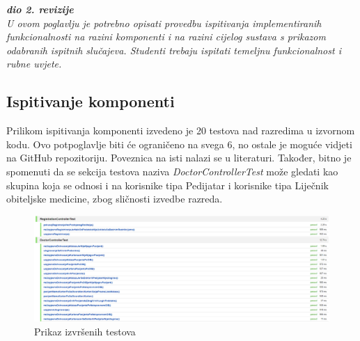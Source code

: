			\textbf{\textit{dio 2. revizije}}\\
			
			 \textit{U ovom poglavlju je potrebno opisati provedbu ispitivanja implementiranih funkcionalnosti na razini komponenti i na razini cijelog sustava s prikazom odabranih ispitnih slučajeva. Studenti trebaju ispitati temeljnu funkcionalnost i rubne uvjete.}
	
			
			\subsection{Ispitivanje komponenti}
			\text Prilikom ispitivanja komponenti izvedeno je 20 testova nad razredima u izvornom kodu. Ovo potpoglavlje biti će ograničeno na svega 6, no ostale je moguće vidjeti na GitHub repozitoriju. Poveznica na isti nalazi se u literaturi. Također, bitno je spomenuti da se sekcija testova naziva \textit{DoctorControllerTest} može gledati kao skupina koja se odnosi i na korisnike tipa Pedijatar i korisnike tipa Liječnik obiteljske medicine, zbog sličnosti izvedbe razreda.
			
			\begin{figure}[H]
				\includegraphics[scale=0.48]{slike/testoviRazreda.PNG} %
				\centering
				\caption{Prikaz izvršenih testova}
				\label{fig:slikatestova}
			\end{figure}
			
